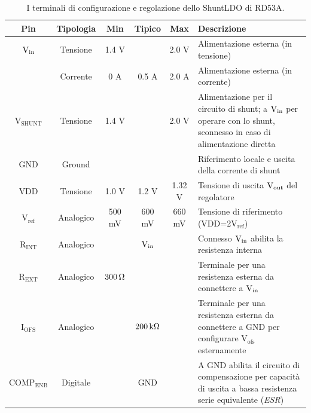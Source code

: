 \begin{table}
\begin{small}
\noindent\setlength\tabcolsep{4pt}%
\begin{tabularx}{\linewidth}{c|c|c|c|c|X}
\textbf{Pin} & \textbf{Tipologia} & \textbf{Min} & \textbf{Tipico} & \textbf{Max} & \textbf{Descrizione} \\ \hline
$\mathrm{V_{in}}$ & Tensione & 1.4 V & & 2.0 V & Alimentazione esterna (in tensione)\\ \hline
 & Corrente & 0 A & 0.5 A & 2.0 A & Alimentazione esterna (in corrente)\\    
$\mathrm{V_{SHUNT}}$ & Tensione & 1.4 V & & 2.0 V & Alimentazione per il circuito di shunt; a $\mathrm{\mathrm{V_{in}}}$ per operare con lo shunt, sconnesso in caso di alimentazione diretta\\ \hline
GND & Ground &  & &  & Riferimento locale e uscita della corrente di shunt\\ \hline
VDD & Tensione & 1.0 V & 1.2 V & 1.32 V & Tensione di uscita $\mathrm{V_{out}}$ del regolatore\\ \hline
$\mathrm{V_{ref}}$ & Analogico & 500 mV & 600 mV & 660 mV & Tensione di riferimento (VDD=2$\mathrm{V_{ref}}$)\\ \hline
$\mathrm{R_{INT}}$ & Analogico &  & $\mathrm{\mathrm{V_{in}}}$ &  & Connesso $\mathrm{\mathrm{V_{in}}}$ abilita la resistenza interna\\ \hline
$\mathrm{R_{EXT}}$ & Analogico & $300{\rm \, \Omega}$ &  &  & Terminale per una resistenza esterna da connettere a $\mathrm{\mathrm{V_{in}}}$\\ \hline
$\mathrm{I_{OFS}}$ & Analogico &  & $200{\rm \, k\Omega}$ &  & Terminale per una resistenza esterna da connettere a GND per configurare $\mathrm{V_{ofs}}$ esternamente\\ \hline
$\mathrm{COMP_{ENB}}$ & Digitale &  & GND &  & A GND abilita il circuito di compensazione per capacit\`a di uscita a bassa resistenza serie equivalente ({\em ESR})\\
\end{tabularx}
\end{small}
\caption{I terminali di configurazione e regolazione dello ShuntLDO di RD53A.}
\label{tab:sldord53a}
\end{table}

